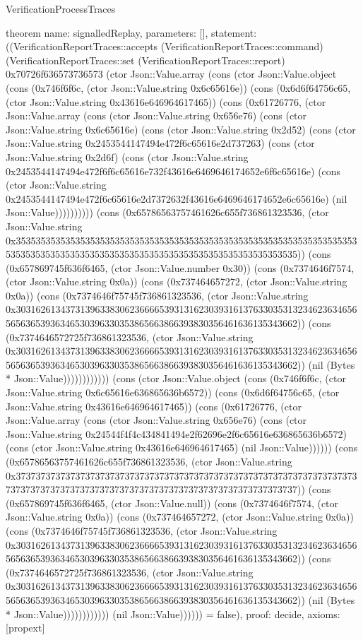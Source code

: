 \begin{lexlean}{VerificationProcessTraces}
\begin{semanticmodule}
theorem{
  name: signalledReplay,
  parameters: [],
  statement: ((VerificationReportTraces::accepts (VerificationReportTraces::command) (VerificationReportTraces::set (VerificationReportTraces::report) 0x70726f636573736573 (ctor Json::Value.array (cons (ctor Json::Value.object (cons (0x746f6f6c, (ctor Json::Value.string 0x6c65616e)) (cons (0x6d6f64756c65, (ctor Json::Value.string 0x43616e646964617465)) (cons (0x61726776, (ctor Json::Value.array (cons (ctor Json::Value.string 0x656e76) (cons (ctor Json::Value.string 0x6c65616e) (cons (ctor Json::Value.string 0x2d52) (cons (ctor Json::Value.string 0x2453544147494e472f6c65616e2d737263) (cons (ctor Json::Value.string 0x2d6f) (cons (ctor Json::Value.string 0x2453544147494e472f6f6c65616e732f43616e6469646174652e6f6c65616e) (cons (ctor Json::Value.string 0x2453544147494e472f6c65616e2d7372632f43616e6469646174652e6c65616e) (nil Json::Value)))))))))) (cons (0x65786563757461626c655f736861323536, (ctor Json::Value.string 0x35353535353535353535353535353535353535353535353535353535353535353535353535353535353535353535353535353535353535353535353535353535)) (cons (0x657869745f636f6465, (ctor Json::Value.number 0x30)) (cons (0x7374646f7574, (ctor Json::Value.string 0x0a)) (cons (0x737464657272, (ctor Json::Value.string 0x0a)) (cons (0x7374646f75745f736861323536, (ctor Json::Value.string 0x30316261343731396338306236666539313162303931613763303531323462363465656563653936346530396330353865663866393830356461636135343662)) (cons (0x7374646572725f736861323536, (ctor Json::Value.string 0x30316261343731396338306236666539313162303931613763303531323462363465656563653936346530396330353865663866393830356461636135343662)) (nil (Bytes * Json::Value)))))))))))) (cons (ctor Json::Value.object (cons (0x746f6f6c, (ctor Json::Value.string 0x6c65616e636865636b6572)) (cons (0x6d6f64756c65, (ctor Json::Value.string 0x43616e646964617465)) (cons (0x61726776, (ctor Json::Value.array (cons (ctor Json::Value.string 0x656e76) (cons (ctor Json::Value.string 0x24544f4f4c434841494e2f62696e2f6c65616e636865636b6572) (cons (ctor Json::Value.string 0x43616e646964617465) (nil Json::Value)))))) (cons (0x65786563757461626c655f736861323536, (ctor Json::Value.string 0x37373737373737373737373737373737373737373737373737373737373737373737373737373737373737373737373737373737373737373737373737373737)) (cons (0x657869745f636f6465, (ctor Json::Value.null)) (cons (0x7374646f7574, (ctor Json::Value.string 0x0a)) (cons (0x737464657272, (ctor Json::Value.string 0x0a)) (cons (0x7374646f75745f736861323536, (ctor Json::Value.string 0x30316261343731396338306236666539313162303931613763303531323462363465656563653936346530396330353865663866393830356461636135343662)) (cons (0x7374646572725f736861323536, (ctor Json::Value.string 0x30316261343731396338306236666539313162303931613763303531323462363465656563653936346530396330353865663866393830356461636135343662)) (nil (Bytes * Json::Value)))))))))))) (nil Json::Value)))))) = false),
  proof: decide{},
  axioms: [propext]
}


\end{semanticmodule}
\end{lexlean}
